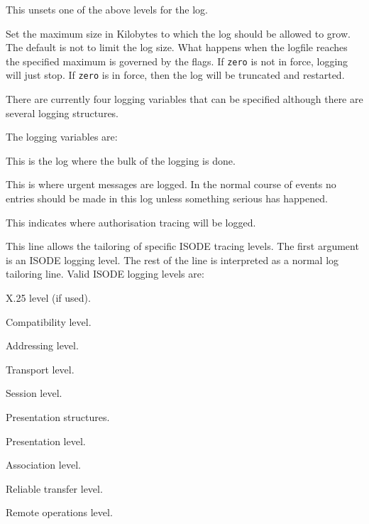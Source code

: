 \begin{describe}
\item[\verb+dflags+:]
This unsets one of the above levels for the log.

\item[\verb+size+:]
Set the maximum size in Kilobytes to which the log should be allowed
to grow. The default is not to limit the log size. What happens when
the logfile reaches the specified maximum is governed by the flags. If
\verb|zero| is not in force, logging will just stop. If \verb|zero| is
in force, then the log will be truncated and restarted.
\end{describe}

There are currently four logging variables that can be specified
although there are several logging structures.  

The logging variables are:

\begin{describe}
\item[\verb+normlog+:]
This is the log where the bulk of the logging is done.

\item[\verb+operlog+:]
This is where urgent messages are logged. In the normal course of
events no entries should be made in this log unless something serious
has happened.

\item[\verb+authlog+:]
This indicates where authorisation tracing will be logged. 

\item[\verb+isodelog+:]
This line allows the tailoring of specific ISODE tracing levels. The
first argument is an ISODE logging level. The rest of
the line is interpreted as a normal log tailoring line.
Valid ISODE logging levels are:
\begin{describe}
\item[\verb+x25level+:]		X.25 level (if used).
\item[\verb+compatlevel+:]	Compatibility level.
\item[\verb+addrlevel+:]	Addressing level.
\item[\verb+tsaplevel+:]	Transport level.
\item[\verb+ssaplevel+:]	Session level.
\item[\verb+psaplevel+:]	Presentation structures.
\item[\verb+psap2level+:]	Presentation level.
\item[\verb+acsaplevel+:]	Association level.
\item[\verb+rtsaplevel+:]	Reliable transfer level.
\item[\verb+rosaplevel+:]	Remote operations level.
\end{describe}

\end{describe}

